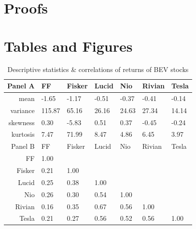 \documentclass[a4paper,12pt]{article}
\begin{document}
\bigskip

\bigskip

\bigskip

\bigskip





\bigskip

\bigskip

\newpage

\begin{LARGE}\textbf{\appendixname{}}\end{LARGE}
\appendix


\section{Proofs}
\label{proofs}



\section{Tables and Figures}
\label{figures}

\begin{table}[!h]
\centering
\begin{tabular}{rllllll}
  \hline
 Panel A & FF & Fisker & Lucid & Nio & Rivian & Tesla \\ 
  \hline
mean & -1.65 & -1.17 & -0.51 & -0.37 & -0.41 & -0.14 \\ 
  variance & 115.87 &  65.16 &  26.16 &  24.63 &  27.34 &  14.14 \\ 
  skewness &  0.30 & -5.83 &  0.51 &  0.37 & -0.45 & -0.24 \\ 
  kurtosis &  7.47 & 71.99 &  8.47 &  4.86 &  6.45 &  3.97 \\ 
  \hline
  \hline
 Panel B & FF & Fisker & Lucid & Nio & Rivian & Tesla \\ 
  \hline
FF & 1.00 &  &  &  &  &  \\ 
  Fisker & 0.21 & 1.00 &  &  &  &  \\ 
  Lucid & 0.25 & 0.38 & 1.00 &  &  &  \\ 
  Nio & 0.26 & 0.30 & 0.54 & 1.00 &  &  \\ 
  Rivian & 0.16 & 0.35 & 0.67 & 0.56 & 1.00 &  \\ 
  Tesla & 0.21 & 0.27 & 0.56 & 0.52 & 0.56 & 1.00 \\ 
   \hline
\end{tabular}
\caption{Descriptive statistics \& correlations of returns of BEV stocks}
\label{tab:bev_stats_correlations}
\end{table}
\end{document}
